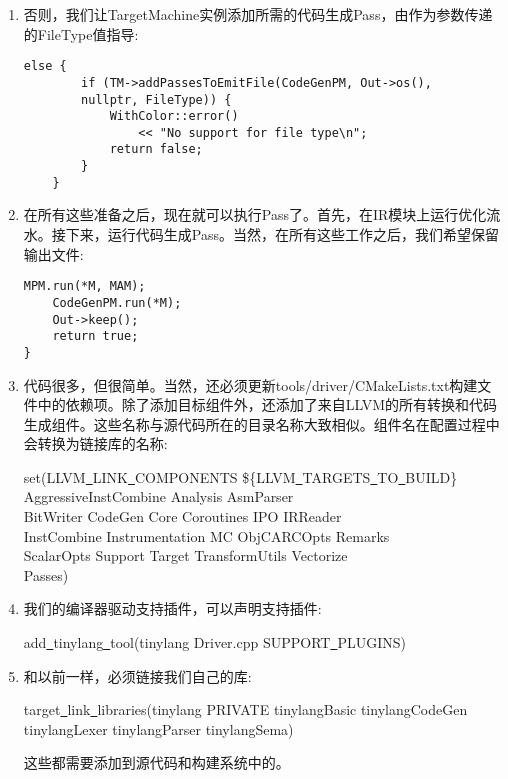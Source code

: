 \begin{enumerate}
\item 否则，我们让TargetMachine实例添加所需的代码生成Pass，由作为参数传递的FileType值指导:
\begin{lstlisting}[caption={}]
	 else {
		if (TM->addPassesToEmitFile(CodeGenPM, Out->os(),
		nullptr, FileType)) {
			WithColor::error()
				<< "No support for file type\n";
			return false;
		}
	}
\end{lstlisting}

\item 在所有这些准备之后，现在就可以执行Pass了。首先，在IR模块上运行优化流水。接下来，运行代码生成Pass。当然，在所有这些工作之后，我们希望保留输出文件:
\begin{lstlisting}[caption={}]
	MPM.run(*M, MAM);
	CodeGenPM.run(*M);
	Out->keep();
	return true;
}
\end{lstlisting}

\item 代码很多，但很简单。当然，还必须更新tools/driver/CMakeLists.txt构建文件中的依赖项。除了添加目标组件外，还添加了来自LLVM的所有转换和代码生成组件。这些名称与源代码所在的目录名称大致相似。组件名在配置过程中会转换为链接库的名称:
\begin{tcolorbox}[colback=white,colframe=black]
set(LLVM\underline{~}LINK\underline{~}COMPONENTS \$\{LLVM\underline{~}TARGETS\underline{~}TO\underline{~}BUILD\} \\
\hspace*{0.5cm}AggressiveInstCombine Analysis AsmParser \\
\hspace*{0.5cm}BitWriter CodeGen Core Coroutines IPO IRReader \\
\hspace*{0.5cm}InstCombine Instrumentation MC ObjCARCOpts Remarks \\
\hspace*{0.5cm}ScalarOpts Support Target TransformUtils Vectorize \\
\hspace*{0.5cm}Passes)
\end{tcolorbox}

\item 我们的编译器驱动支持插件，可以声明支持插件:
\begin{tcolorbox}[colback=white,colframe=black]
add\underline{~}tinylang\underline{~}tool(tinylang Driver.cpp SUPPORT\underline{~}PLUGINS)
\end{tcolorbox}

\item 和以前一样，必须链接我们自己的库:
\begin{tcolorbox}[colback=white,colframe=black]
target\underline{~}link\underline{~}libraries(tinylang
\hspace*{0.5cm}PRIVATE tinylangBasic tinylangCodeGen
\hspace*{0.5cm}tinylangLexer tinylangParser tinylangSema)
\end{tcolorbox}
这些都需要添加到源代码和构建系统中的。


\end{enumerate}
